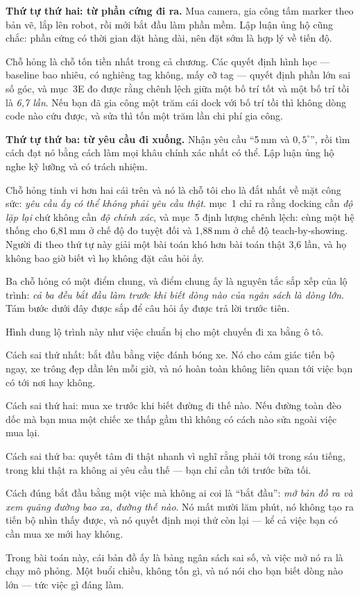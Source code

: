 \documentclass[../../marker.tex]{subfiles}
\begin{document}
\textbf{Thứ tự thứ hai: từ phần cứng đi ra.} Mua camera, gia công tấm marker theo bản vẽ, lắp lên robot, rồi mới bắt đầu làm phần mềm. Lập luận ủng hộ cũng chắc: phần cứng có thời gian đặt hàng dài, nên đặt sớm là hợp lý về tiến độ.

Chỗ hỏng là chỗ tốn tiền nhất trong cả chương. Các quyết định hình học --- baseline bao nhiêu, có nghiêng tag không, mấy cỡ tag --- quyết định phần lớn sai số góc, và  mục~3E đo được rằng chênh lệch giữa một bố trí tốt và một bố trí tồi là \emph{6,7 lần}. Nếu bạn đã gia công một trăm cái dock với bố trí tồi thì không dòng code nào cứu được, và sửa thì tốn một trăm lần chi phí gia công.

\textbf{Thứ tự thứ ba: từ yêu cầu đi xuống.} Nhận yêu cầu ``5\,mm và \(0{,}5^\circ\)'', rồi tìm cách đạt nó bằng cách làm mọi khâu chính xác nhất có thể. Lập luận ủng hộ nghe kỹ lưỡng và có trách nhiệm.

Chỗ hỏng tinh vi hơn hai cái trên và nó là chỗ tôi cho là đắt nhất về mặt công sức: \emph{yêu cầu ấy có thể không phải yêu cầu thật}.  mục~1 chỉ ra rằng docking cần \emph{độ lặp lại} chứ không cần \emph{độ chính xác}, và  mục~5 định lượng chênh lệch: cùng một hệ thống cho 6,81\,mm ở chế độ đo tuyệt đối và 1,88\,mm ở chế độ teach-by-showing. Người đi theo thứ tự này giải một bài toán khó hơn bài toán thật 3,6 lần, và họ không bao giờ biết vì họ không đặt câu hỏi ấy.

Ba chỗ hỏng có một điểm chung, và điểm chung ấy là nguyên tắc sắp xếp của lộ trình: \emph{cả ba đều bắt đầu làm trước khi biết dòng nào của ngân sách là dòng lớn}. Tám bước dưới đây được sắp để câu hỏi ấy được trả lời trước tiên.

\begin{trucgiac}
Hình dung lộ trình này như việc chuẩn bị cho một chuyến đi xa bằng ô tô.

Cách sai thứ nhất: bắt đầu bằng việc đánh bóng xe. Nó cho cảm giác tiến bộ ngay, xe trông đẹp dần lên mỗi giờ, và nó hoàn toàn không liên quan tới việc bạn có tới nơi hay không.

Cách sai thứ hai: mua xe trước khi biết đường đi thế nào. Nếu đường toàn đèo dốc mà bạn mua một chiếc xe thấp gầm thì không có cách nào sửa ngoài việc mua lại.

Cách sai thứ ba: quyết tâm đi thật nhanh vì nghĩ rằng phải tới trong sáu tiếng, trong khi thật ra không ai yêu cầu thế --- bạn chỉ cần tới trước bữa tối.

Cách đúng bắt đầu bằng một việc mà không ai coi là ``bắt đầu'': \emph{mở bản đồ ra và xem quãng đường bao xa, đường thế nào}. Nó mất mười lăm phút, nó không tạo ra tiến bộ nhìn thấy được, và nó quyết định mọi thứ còn lại --- kể cả việc bạn có cần mua xe mới hay không.

Trong bài toán này, cái bản đồ ấy là bảng ngân sách sai số, và việc mở nó ra là chạy mô phỏng. Một buổi chiều, không tốn gì, và nó nói cho bạn biết dòng nào lớn --- tức việc gì đáng làm.
\end{trucgiac}
\end{document}
